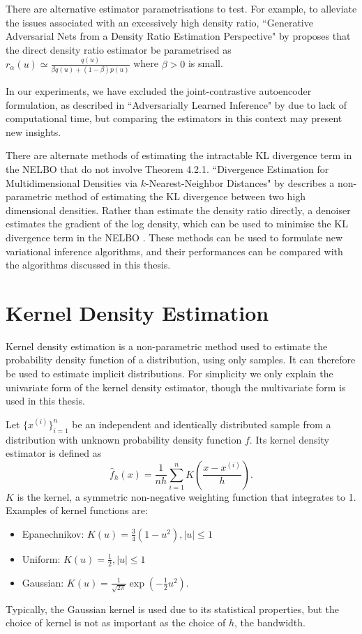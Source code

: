 \documentclass[honours,12pt]{unswthesis}
\numberwithin{equation}{section}
\theoremstyle{definition}
\begin{document}
There are alternative estimator parametrisations to test. For example, to alleviate the issues associated with an excessively high density ratio, ``Generative Adversarial Nets from a Density Ratio Estimation Perspective" by \citet{bgan} proposes that the direct density ratio estimator be parametrised as $r_\alpha(u)\simeq \frac{q(u)}{\beta q(u)+(1-\beta)p(u)}$ where $\beta>0$ is small.

In our experiments, we have excluded the joint-contrastive autoencoder formulation, as described in ``Adversarially Learned Inference" by \citet{ali} due to lack of computational time, but comparing the estimators in this context may present new insights.

There are alternate methods of estimating the intractable KL divergence term in the NELBO that do not involve Theorem 4.2.1. ``Divergence Estimation for Multidimensional Densities via $k$-Nearest-Neighbor Distances" by \citet{wang} describes a non-parametric method of estimating the KL divergence between two high dimensional densities. Rather than estimate the density ratio directly, a denoiser estimates the gradient of the log density, which can be used to minimise the KL divergence term in the NELBO \citep{vincent}. These methods can be used to formulate new variational inference algorithms, and their performances can be compared with the algorithms discussed in this thesis.


\clearpage
{}





\newpage
\appendix
\chapter{Kernel Density Estimation}
Kernel density estimation is a non-parametric method used to estimate the probability density function of a distribution, using only samples. It can therefore be used to estimate implicit distributions. For simplicity we only explain the univariate form of the kernel density estimator, though the multivariate form is used in this thesis.

Let $\{x^{(i)}\}^n_{i=1}$ be an independent and identically distributed sample from a distribution with unknown probability density function $f$. Its kernel density estimator is defined as
\[\hat{f}_h(x)=\frac{1}{nh}\sum^n_{i=1}K\left(\frac{x-x^{(i)}}{h}\right).\]
$K$ is the kernel, a symmetric non-negative weighting function that integrates to 1. Examples of kernel functions are:
\begin{itemize}
\item Epanechnikov: $K(u)=\frac{3}{4}(1-u^2), |u|\leq 1$
\item Uniform: $K(u)=\frac12, |u|\leq 1$
\item Gaussian: $K(u)=\frac{1}{\sqrt{2\pi}}\exp\left(-\frac{1}{2}u^2\right)$.
\end{itemize}
Typically, the Gaussian kernel is used due to its statistical properties, but the choice of kernel is not as important as the choice of $h$, the bandwidth.
\end{document}
